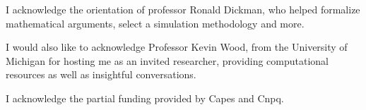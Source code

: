 \pretextual


\imprimirfolhaderosto*


%
\begin{fichacatalografica}
    
\end{fichacatalografica}


%
\begin{folhadeaprovacao}
     
\end{folhadeaprovacao}
%



\begin{agradecimentos}

I acknowledge the orientation of professor Ronald Dickman, who helped formalize mathematical arguments, select a simulation methodology
and more.

I would also like to acknowledge Professor Kevin Wood, from the University of Michigan for hosting me as an invited researcher,
providing computational resources as well as insightful conversations.

I acknowledge the partial funding provided by Capes and Cnpq.

\end{agradecimentos}

